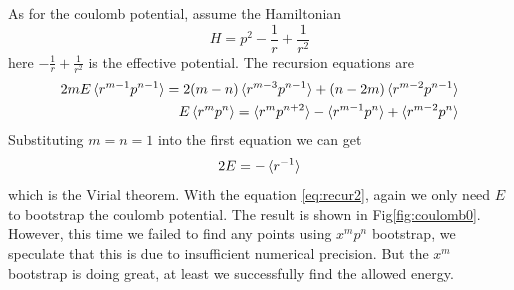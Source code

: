 \documentclass[aps, preprint,amsmath, amssymb]{revtex4-2}
\begin{document}
As for the coulomb potential, assume the Hamiltonian
\begin{equation}
	H = p^2 - \frac1r + \frac1{r^2}
\end{equation}
here $- \frac1r + \frac1{r^2}$ is the effective potential. The recursion equations are
\begin{align}
	2mE\braket{r^{m - 1} p^{n - 1}} = 2(m - n)\braket{r^{m - 3} p^{n - 1}} + (n - 2m)\braket{r^{m - 2} p^{n - 1}} \notag \\
	E\braket{r^m p^n} = \braket{r^m p^{n + 2}} - \braket{r^{m - 1} p^n} + \braket{r^{m - 2} p^n} \label{eq:coul}
\end{align}
Substituting $m = n = 1$ into the first equation we can get
\begin{equation}
	2E = -\braket{r^{-1}}
\end{equation}
which is the Virial theorem.  {With the equation \eqref{eq:recur2}, again we only need $E$ to bootstrap the coulomb potential. The result is shown in Fig\ref{fig:coulomb0}. However, this time we failed to find any points using $x^m p^n$ bootstrap, we speculate that this is due to insufficient numerical precision. But the $x^m$ bootstrap is doing great, at least we successfully find the allowed energy.}
\end{document}
